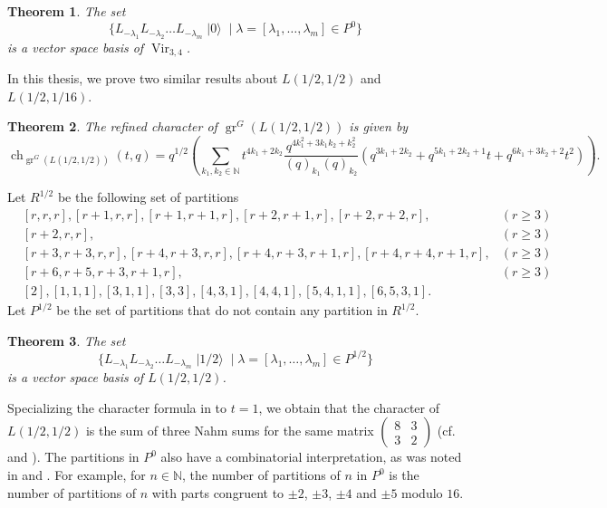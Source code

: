 \documentclass[a4paper, 12pt, reqno]{amsart}
\newtheorem{theorem}{Theorem}[section]
\theoremstyle{remark}
\DeclareMathOperator{\Vir}{Vir}
\DeclareMathOperator{\gr}{gr}
\DeclareMathOperator{\ch}{ch}
\DeclareMathOperator{\vac}{|0\rangle}
\DeclareMathOperator{\vachalf}{|1/2\rangle}
\begin{document}
\begin{theorem}
  \label{thr:2}
  The set
  \begin{equation*}
    \{L_{-\lambda_1}L_{-\lambda_2}\dots L_{-\lambda_m}\vac \mid \lambda = [\lambda_1, \dots, \lambda_m] \in P^0\}
  \end{equation*}
  is a vector space basis of $\Vir_{3, 4}$.
\end{theorem}

In this thesis, we prove two similar results about $L(1/2, 1/2)$ and $L(1/2, 1/16)$.

\begin{theorem}
  \label{thr:3}
  The refined character of $\gr^G(L(1/2, 1/2))$ is given by
  \begin{equation*}
    \ch_{\gr^G(L(1/2, 1/2))}(t, q) = q^{1/2}\left(\sum_{k_1, k_2 \in \mathbb{N}}t^{4k_1 + 2k_2}\frac{q^{4k_1^2 + 3k_1k_2 + k_2^2}}{(q)_{k_1}(q)_{k_2}}(q^{3k_1 + 2k_2} + q^{5k_1 + 2k_2 + 1}t + q^{6k_1 + 3k_2 + 2}t^2)\right).
  \end{equation*}
\end{theorem}

Let $R^{1/2}$ be the following set of partitions
\begin{align*}
  &[r, r, r], [r + 1, r, r], [r + 1, r + 1, r], [r + 2, r + 1, r], [r + 2, r + 2, r], &(r \ge 3) \\
  &[r + 2, r, r], &(r \ge 3) \\
  &[r + 3, r + 3, r, r], [r + 4, r + 3, r, r],  [r + 4, r + 3, r + 1, r], [r + 4, r + 4, r + 1, r], &(r \ge 3)\\
  &[r + 6, r + 5, r + 3, r + 1, r], &(r \ge 3) \\
  &[2], [1, 1, 1], [3, 1, 1], [3, 3], [4, 3, 1], [4, 4, 1], [5, 4, 1, 1], [6, 5, 3, 1].
\end{align*}
Let $P^{1/2}$ be the set of partitions that do not contain any partition in $R^{1/2}$.

\begin{theorem}
  \label{thr:4}
  The set
  \begin{equation*}
    \{L_{-\lambda_1}L_{-\lambda_2}\dots L_{-\lambda_m}\vachalf \mid \lambda = [\lambda_1, \dots, \lambda_m] \in P^{1/2}\}
  \end{equation*}
  is a vector space basis of $L(1/2, 1/2)$.
\end{theorem}

Specializing the character formula in  to $t = 1$, we obtain that the character of $L(1/2, 1/2)$ is the sum of three Nahm sums for the same matrix $\left(\begin{smallmatrix} 8 & 3 \\ 3 & 2 \end{smallmatrix}\right)$ (cf.\ \cite{Nahm2007} and \cite{andrews_singular_2022}).
The partitions in $P^0$ also have a combinatorial interpretation, as was noted in \cite{andrews_singular_2022} and \cite{tsuchioka_vertex_2023}.
For example, for $n \in \mathbb{N}$, the number of partitions of $n$ in $P^0$ is the number of partitions of $n$ with parts congruent to $\pm2$, $\pm3$, $\pm4$ and $\pm5$ modulo $16$.
\end{document}
